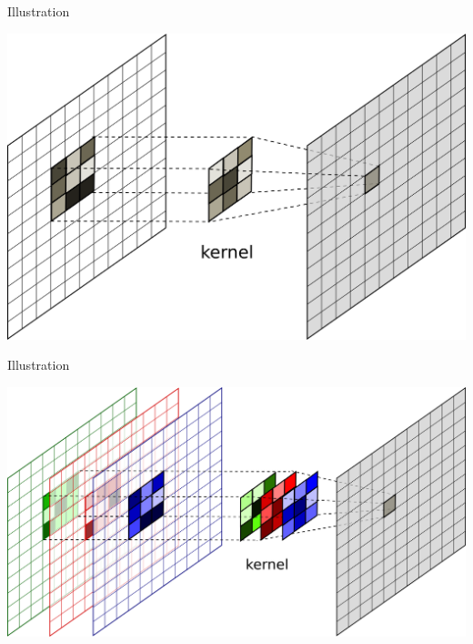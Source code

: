 \documentclass[xcolor=pdftex,dvipsnames,table,mathserif]{beamer}
\begin{document}
\begin{frame}{Illustration}

  \begin{center}
    \includegraphics[height=0.5\textheight]{conv_base}
  \end{center}

\end{frame}

\begin{frame}{Illustration}

  \begin{center}
    \includegraphics[height=0.5\textheight]{conv_3channels}
  \end{center}

\end{frame}
\end{document}
